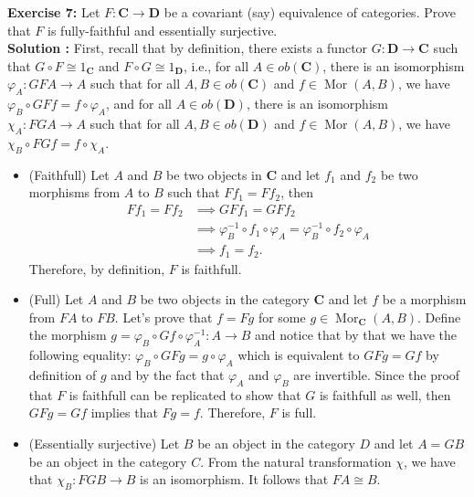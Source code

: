 \documentclass{article}
\newcommand{\CatC}{\textbf{C}}
\newcommand{\CatD}{\textbf{D}}
\DeclareMathOperator{\Mor}{Mor}
\newcommand{\isomorphic}{\cong}
\begin{document}
\newpage

\noindent \textbf{Exercise 7:} Let $F : \CatC \to \CatD$ be a covariant (say) equivalence of categories. Prove that $F$ is fully-faithful and essentially surjective. \\

\noindent \textbf{Solution :} First, recall that by definition, there exists a functor $G : \CatD \to \CatC$ such that $G \circ F \isomorphic 1_{\CatC}$ and $F \circ G \isomorphic 1_{\CatD}$, i.e., for all $A \in ob(\CatC)$, there is an isomorphism $\varphi_A : GFA \to A$ such that for all $A,B \in ob(\CatC)$ and $f \in \Mor(A,B)$, we have $\varphi_B \circ GFf = f \circ \varphi_A$, and for all $A \in ob(\CatD)$, there is an isomorphism $\chi_A : FGA \to A$ such that for all $A,B \in ob(\CatD)$ and $f \in \Mor(A,B)$, we have $\chi_B \circ FGf = f \circ \chi_A$.
\begin{itemize}
    \item (Faithfull) Let $A$ and $B$ be two objects in $\CatC$ and let $f_1$ and $f_2$ be two morphisms from $A$ to $B$ such that $Ff_1 = Ff_2$, then
    \begin{align*}
        Ff_1 = Ff_2 &\implies GFf_1 = GFf_2 \\
        &\implies \varphi_B^{-1} \circ f_1 \circ \varphi_A = \varphi_B^{-1} \circ f_2 \circ \varphi_A \\
        &\implies f_1 = f_2.
    \end{align*}
    Therefore, by definition, $F$ is faithfull.
    \item (Full) Let $A$ and $B$ be two objects in the category $\CatC$ and let $f$ be a morphism from $FA$ to $FB$. Let's prove that $f = Fg$ for some $g \in \Mor_{\CatC}(A,B)$. Define the morphism $g = \varphi_B \circ Gf \circ \varphi_A^{-1} : A \to B$ and notice that by that we have the following equality: $\varphi_B \circ GFg = g \circ \varphi_A$ which is equivalent to $GFg = Gf$ by definition of $g$ and by the fact that $\varphi_A$ and $\varphi_B$ are invertible. Since the proof that $F$ is faithfull can be replicated to show that $G$ is faithfull as well, then $GFg = Gf$ implies that $Fg = f$. Therefore, $F$ is full.
    \item (Essentially surjective) Let $B$ be an object in the category $D$ and let $A = GB$ be an object in the category $C$. From the natural transformation $\chi$, we have that $\chi_B : FGB \to B$ is an isomorphism. It follows that $FA \isomorphic B$.
\end{itemize}
\end{document}
